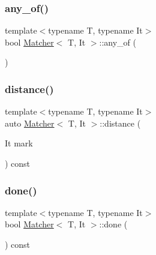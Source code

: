 \mbox{\label{class_matcher_a6cfab4944429c85a33d872691e0976c8}} 
\subsubsection{\texorpdfstring{any\+\_\+of()}{any\_of()}\hspace{0.1cm}{\footnotesize\ttfamily [2/2]}}
{\footnotesize\ttfamily template$<$typename T, typename It$>$ \\
bool \hyperlink{class_matcher}{Matcher}$<$ T, It $>$\+::any\+\_\+of (\begin{DoxyParamCaption}{ }\end{DoxyParamCaption})\hspace{0.3cm}{\ttfamily [inline]}}

\mbox{\label{class_matcher_aeaa3afef2409a98c71a1dec0c0bc32b2}} 
\subsubsection{\texorpdfstring{distance()}{distance()}}
{\footnotesize\ttfamily template$<$typename T, typename It$>$ \\
auto \hyperlink{class_matcher}{Matcher}$<$ T, It $>$\+::distance (\begin{DoxyParamCaption}\item[{It}]{mark }\end{DoxyParamCaption}) const\hspace{0.3cm}{\ttfamily [inline]}}

\mbox{\label{class_matcher_afb8b791024067df37631ce67dcd4c656}} 
\subsubsection{\texorpdfstring{done()}{done()}}
{\footnotesize\ttfamily template$<$typename T, typename It$>$ \\
bool \hyperlink{class_matcher}{Matcher}$<$ T, It $>$\+::done (\begin{DoxyParamCaption}{ }\end{DoxyParamCaption}) const\hspace{0.3cm}{\ttfamily [inline]}}


